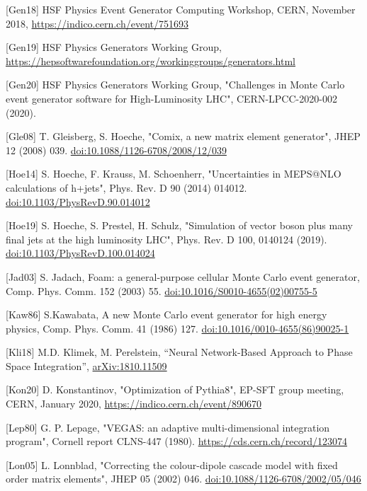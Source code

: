 \documentclass[11pt,a4paper]{article}
\begin{document}
{[}Gen18{]} HSF Physics Event Generator Computing Workshop, CERN,
November 2018,
\href{https://indico.cern.ch/event/751693}{{https://indico.cern.ch/event/751693}}

{[}Gen19{]} HSF Physics Generators Working Group,
\href{https://hepsoftwarefoundation.org/workinggroups/generators.html}{{https://hepsoftwarefoundation.org/workinggroups/generators.html}}

{[}Gen20{]} HSF Physics Generators Working Group, "Challenges in Monte
Carlo event generator software for High-Luminosity LHC", CERN-LPCC-2020-002 (2020).

{[}Gle08{]} T. Gleisberg, S. Hoeche, "Comix, a new matrix element
generator", JHEP 12 (2008) 039.
\href{https://doi.org/10.1088/1126-6708/2008/12/039}{{doi:10.1088/1126-6708/2008/12/039}}

{[}Hoe14{]} S. Hoeche, F. Krauss, M. Schoenherr, "Uncertainties in
MEPS@NLO calculations of h+jets", Phys. Rev. D 90 (2014) 014012.
\href{https://doi.org/10.1103/PhysRevD.90.014012}{{doi:10.1103/PhysRevD.90.014012}}

{[}Hoe19{]} S. Hoeche, S. Prestel, H. Schulz, "Simulation of vector
boson plus many final jets at the high luminosity LHC", Phys. Rev. D
100, 0140124 (2019).
\href{http://dx.doi.org/10.1103/PhysRevD.100.014024}{{doi:10.1103/PhysRevD.100.014024}}

{[}Jad03{]} S. Jadach, Foam: a general-purpose cellular Monte Carlo
event generator, Comp. Phys. Comm. 152 (2003) 55.
\href{https://doi.org/10.1016/S0010-4655(02)00755-5}{{doi:10.1016/S0010-4655(02)00755-5}}

{[}Kaw86{]} S.Kawabata, A new Monte Carlo event generator for high
energy physics, Comp. Phys. Comm. 41 (1986) 127.
\href{https://doi.org/10.1016/0010-4655(86)90025-1}{{doi:10.1016/0010-4655(86)90025-1}}

{[}Kli18{]} M.D. Klimek, M. Perelstein, ``Neural Network-Based Approach
to Phase Space Integration'',
\href{https://arxiv.org/abs/1810.11509}{{arXiv:1810.11509}}

{[}Kon20{]} D. Konstantinov, "Optimization of Pythia8", EP-SFT group
meeting, CERN, January 2020,
\href{https://indico.cern.ch/event/890670}{{https://indico.cern.ch/event/890670}}

{[}Lep80{]} G. P. Lepage, "VEGAS: an adaptive multi-dimensional
integration program", Cornell report CLNS-447 (1980).
\href{https://cds.cern.ch/record/123074}{{https://cds.cern.ch/record/123074}}

{[}Lon05{]} L. Lonnblad, "Correcting the colour-dipole cascade model
with fixed order matrix elements", JHEP 05 (2002) 046.
\href{https://doi.org/10.1088/1126-6708/2002/05/046}{{doi:10.1088/1126-6708/2002/05/046}}
\end{document}
